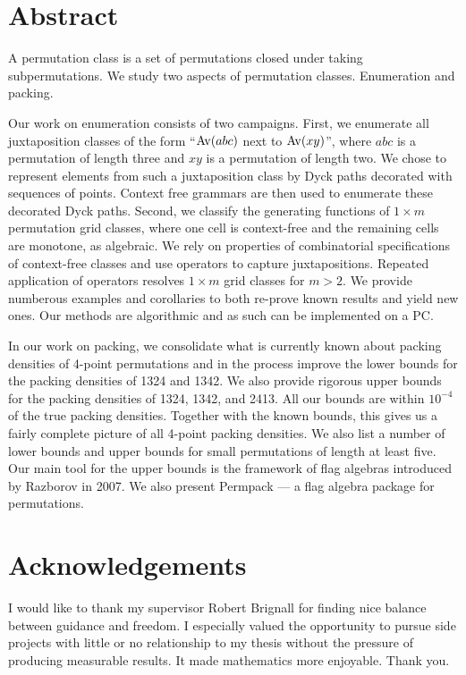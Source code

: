 \documentclass[12pt, a4paper, twoside]{report}
\begin{document}




\setcounter{secnumdepth}{-3}%
\chapter{Abstract}
A permutation class is a set of permutations closed under taking subpermutations. We study two aspects of permutation classes. Enumeration and packing.

Our work on enumeration consists of two campaigns. First, we enumerate all juxtaposition classes of the form ``$\mathrm{Av}(abc)$ next to $\mathrm{Av}(xy)$'', where $abc$ is a permutation of length three and $xy$ is a permutation of length two. We chose to represent elements from such a juxtaposition class by Dyck paths decorated with sequences of points. Context free grammars are then used to enumerate these decorated Dyck paths. Second, we classify the generating functions of $1\times m$ permutation grid classes, where one cell is context-free and the remaining cells are monotone, as algebraic. We rely on properties of combinatorial specifications of context-free classes and use operators to capture juxtapositions. Repeated application of operators resolves $1\times m$ grid classes for $m>2$. We provide numberous examples and corollaries to both re-prove known results and yield new ones. Our methods are algorithmic and as such can be implemented on a PC.

In our work on packing, we consolidate what is currently known about packing densities of 4-point permutations and in the process improve the lower bounds for the packing densities of 1324 and 1342. We also provide rigorous upper bounds for the packing densities of 1324, 1342, and 2413. All our bounds are within $10^{-4}$ of the true packing densities. Together with the known bounds, this gives us a fairly complete picture of all 4-point packing densities. We also list a number of lower bounds and upper bounds for small permutations of length at least five. Our main tool for the upper bounds is the framework of flag algebras introduced by Razborov in 2007. We also present Permpack --- a flag algebra package for permutations. 

\chapter{Acknowledgements}
I would like to thank my supervisor Robert Brignall for finding nice balance between guidance and freedom. I especially valued the opportunity to pursue side projects with little or no relationship to my thesis without the pressure of producing measurable results. It made mathematics more enjoyable. Thank you.\\
\end{document}
